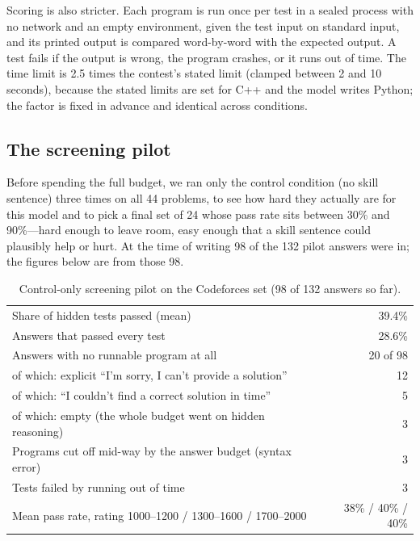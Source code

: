\documentclass[11pt,a4paper]{article}
\newcommand{\provisional}[1]{\textcolor{red!70!black}{#1}}
\begin{document}
Scoring is also stricter. Each program is run once per test in a sealed process with no network and an empty environment, given the test input on standard input, and its printed output is compared word-by-word with the expected output. A test fails if the output is wrong, the program crashes, or it runs out of time. The time limit is 2.5 times the contest's stated limit (clamped between 2 and 10 seconds), because the stated limits are set for C++ and the model writes Python; the factor is fixed in advance and identical across conditions.

\subsection{The screening pilot}
Before spending the full budget, we ran only the control condition (no skill sentence) three times on all 44 problems, to see how hard they actually are for this model and to pick a final set of 24 whose pass rate sits between 30\% and 90\%---hard enough to leave room, easy enough that a skill sentence could plausibly help or hurt. \provisional{At the time of writing 98 of the 132 pilot answers were in}; the figures below are from those 98.

\begin{table}[H]
\centering\small
\caption{Control-only screening pilot on the Codeforces set (98 of 132 answers so far).}
\begin{tabular}{lr}
\toprule
Share of hidden tests passed (mean) & 39.4\% \\
Answers that passed every test & 28.6\% \\
Answers with no runnable program at all & 20 of 98 \\
\quad of which: explicit ``I'm sorry, I can't provide a solution'' & 12 \\
\quad of which: ``I couldn't find a correct solution in time'' & 5 \\
\quad of which: empty (the whole budget went on hidden reasoning) & 3 \\
Programs cut off mid-way by the answer budget (syntax error) & 3 \\
Tests failed by running out of time & 3 \\
Mean pass rate, rating 1000--1200 / 1300--1600 / 1700--2000 & 38\% / 40\% / 40\% \\
\bottomrule
\end{tabular}
\end{table}
\end{document}
